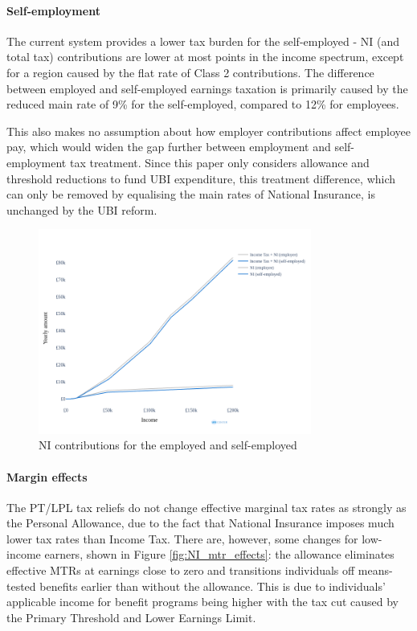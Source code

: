\documentclass{article}
\begin{document}
    \paragraph{Self-employment} The current system provides a lower tax burden for the self-employed - NI (and total tax) contributions are lower at most points in the income spectrum, except for a region caused by the flat rate of Class 2 contributions. The difference between employed and self-employed earnings taxation is primarily caused by the reduced main rate of 9\% for the self-employed, compared to 12\% for employees. 
    
    This also makes no assumption about how employer contributions affect employee pay, which would widen the gap further between employment and self-employment tax treatment. Since this paper only considers allowance and threshold reductions to fund UBI expenditure, this treatment difference, which can only be removed by equalising the main rates of National Insurance, is unchanged by the UBI reform.

    \begin{figure}
        \centering
        \includegraphics[width=0.8\textwidth]{images/fig_8.png}
        \caption{NI contributions for the employed and self-employed}
        \label{fig:NI_self_emp_diff}
    \end{figure}

    \paragraph{Margin effects} The PT/LPL tax reliefs do not change effective marginal tax rates as strongly as the Personal Allowance, due to the fact that National Insurance imposes much lower tax rates than Income Tax. There are, however, some changes for low-income earners, shown in Figure \ref{fig:NI_mtr_effects}: the allowance eliminates effective MTRs at earnings close to zero and transitions individuals off means-tested benefits earlier than without the allowance. This is due to individuals' applicable income for benefit programs being higher with the tax cut caused by the Primary Threshold and Lower Earnings Limit.
\end{document}
